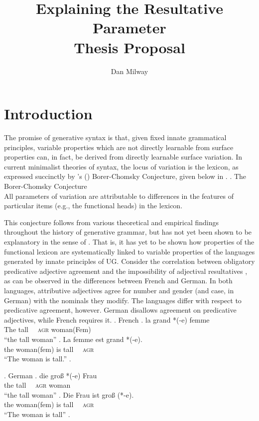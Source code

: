 \documentclass[letterpaper,12pt]{article}
\title{Explaining the Resultative Parameter\\{\large Thesis Proposal}}
\author{Dan Milway}
\begin{document}
\maketitle

\section{Introduction}
The promise of generative syntax is that, given fixed innate grammatical principles, variable properties which are not directly learnable from surface properties can, in fact, be derived from directly learnable surface variation.
In current minimalist theories of syntax, the locus of variation is the lexicon, as expressed succinctly by \citeauthor{baker2008microparameter}'s (\citeyear{baker2008microparameter}) Borer-Chomsky Conjecture, given below in \Next.
\ex. The Borer-Chomsky Conjecture\\
All parameters of variation are attributable to differences in the features of particular items (e.g., the functional heads) in the lexicon. \hfill \parencite{baker2008microparameter}

This conjecture follows from various theoretical and empirical findings throughout the history of generative grammar, but has not yet been shown to be explanatory in the sense of \textcite{chomsky1965aspects}.
That is, it has yet to be shown how properties of the functional lexicon are systematically linked to variable properties of the languages generated by innate principles of UG.
Consider the correlation between obligatory predicative adjective agreement and the impossibility of adjectival resultatives \parencite{kratzer_building_2004}, as can be observed in the differences between French and German.
In both languages, attributive adjectives agree for number and gender (and case, in German) with the nominals they modify. 
The languages differ with respect to predicative agreement, however.
German disallows agreement on predicative adjectives, while French requires it.
\ex. French 
\ag. la grand *(-e) femme\\
The tall \textsc{~~agr} woman(Fem)\\
``the tall woman''
\bg. La femme est grand *(-e).\\
the woman(fem) is tall \textsc{~~agr}\\
``The woman is tall.''
\z.

\ex. German 
\ag. die gro\ss{} *(-e) Frau\\
the tall \textsc{~~agr} woman\\
``the tall woman''
\bg. Die Frau ist gro\ss{} (*-e).\\
the woman(fem) is tall \textsc{~~agr}\\
``The woman is tall''
\z.
\end{document}

